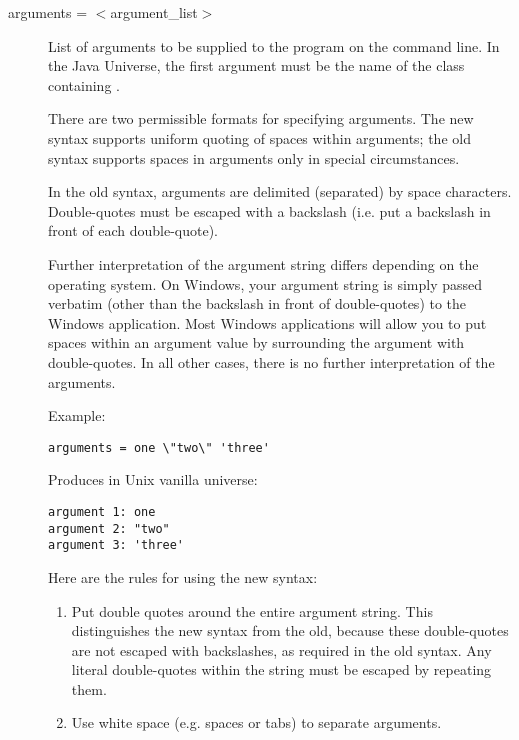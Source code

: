 \begin{description} 


\item[arguments = $<$argument\_list$>$]
\label{man-condor-submit-arguments}
List of arguments to be supplied
to the program on the command line.   In the Java Universe, the first
argument must be the name of the class containing .

There are two permissible formats for specifying arguments.  The new
syntax supports uniform quoting of spaces within arguments; the old
syntax supports spaces in arguments only in special circumstances.

In the old syntax, arguments are delimited (separated) by space
characters.  Double-quotes must be escaped with a backslash (i.e. put
a backslash in front of each double-quote).

Further interpretation of the argument string differs depending on the
operating system.  On Windows, your argument string is
simply passed verbatim (other than the backslash in front of
double-quotes) to the Windows application.  Most Windows applications
will allow you to put spaces within an argument value by surrounding
the argument with double-quotes.
In all
other cases, there is no further interpretation of the arguments.

Example:

\begin{verbatim}
arguments = one \"two\" 'three'
\end{verbatim}

Produces in Unix vanilla universe:

\begin{verbatim}
argument 1: one
argument 2: "two"
argument 3: 'three'
\end{verbatim}

Here are the rules for using the new syntax:

\begin{enumerate}

\item Put double quotes around the entire argument string.  This
distinguishes the new syntax from the old, because these double-quotes
are not escaped with backslashes, as required in the old syntax.  Any
literal double-quotes within the string must be escaped by repeating
them.

\item Use white space (e.g. spaces or tabs) to separate arguments.


\end{enumerate}
\end{description}
